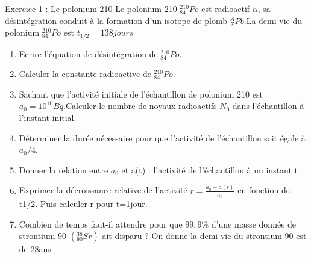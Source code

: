 \documentclass[12pt, french]{article}
\begin{document}
\begin{center}
\end{center}

\vspace{-0.2cm}
   \begin{Box2}{Exercice 1 :  Le polonium 210}
	   Le polonium 210 $_{84}^{210}Po$ est radioactif $\alpha$, sa désintégration conduit à la formation d’un isotope de plomb $_Z^APb$.La demi-vie du polonium $_{84}^{210}Po$ est $t_{1/2}=138jours$ 
	   \begin{enumerate}
		   \item Ecrire l’équation de désintégration de $_{84}^{210}Po$.
		   \item Calculer la constante radioactive de $_{84}^{210}Po$.
		   \item Sachant que l’activité initiale de l’échantillon de polonium 210 est $a_0 = 10^{10}Bq$.Calculer le nombre de
noyaux radioactifs $N_0$ dans l’échantillon à l’instant initial.
\item Déterminer la durée nécessaire pour que l’activité de l’échantillon soit égale à $a_0/4$.
\item Donner la relation entre $a_0$ et a(t) : l’activité de l’échantillon à un instant t

\item Exprimer la décroissance relative de l’activité $r=\frac{a_0 - a(t)}{a_0}$ en fonction de t1/2. Puis calculer r pour t=1jour.

\item Combien de temps faut-il attendre pour que $99,9\%$ d’une masse donnée de strontium 90 $(_{90}^{38}Sr)$ ait disparu ? On donne la demi-vie du strontium 90 est de 28ans
	   \end{enumerate}


   \end{Box2}
\end{document}
